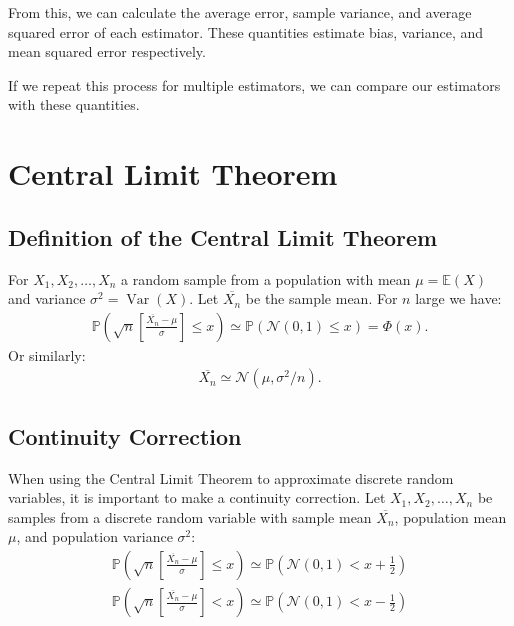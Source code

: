 \documentclass[a4paper, 12pt, twoside]{article}
\DeclareMathOperator{\Var}{Var}
\begin{document}
From this, we can calculate the average error, sample variance, and
average squared error of each estimator. These quantities estimate
bias, variance, and mean squared error respectively.

\vspace{\baselineskip}

If we repeat this process for multiple estimators, we can compare
our estimators with these quantities.

\section{Central Limit Theorem}

\subsection{Definition of the Central Limit Theorem}

For $X_1, X_2, \ldots, X_n$ a random sample from a population with
mean $\mu = \mathbb{E}(X)$ and variance $\sigma^2 = \Var(X)$. Let
$\overline{X_n}$ be the sample mean. For $n$ large we have:
\begin{align*}
    \mathbb{P}\left( \sqrt{n}
    \left[\frac{\overline{X_n} - \mu}{\sigma}\right]
    \leq x \right) \simeq \mathbb{P}(\mathcal{N}(0, 1) \leq x) = \Phi(x).
\end{align*}
Or similarly:
\begin{align*}
    \overline{X_n} \simeq \mathcal{N}(\mu, \sigma^2/n).
\end{align*}

\subsection{Continuity Correction}

When using the Central Limit Theorem to approximate discrete random
variables, it is important to make a continuity correction. Let
$X_1, X_2, \ldots, X_n$ be samples from a discrete random variable
with sample mean $\overline{X_n}$, population mean $\mu$, and
population variance $\sigma^2$:
\begin{align*}
    \mathbb{P}\left( \sqrt{n}
    \left[\frac{\overline{X_n} - \mu}{\sigma}\right]
    \leq x \right) \simeq \mathbb{P}(\mathcal{N}(0, 1)
    < x + \frac{1}{2}) \\
    \mathbb{P}\left( \sqrt{n}
    \left[\frac{\overline{X_n} - \mu}{\sigma}\right]
    < x \right) \simeq \mathbb{P}(\mathcal{N}(0, 1)
    < x - \frac{1}{2})
\end{align*}
\end{document}
